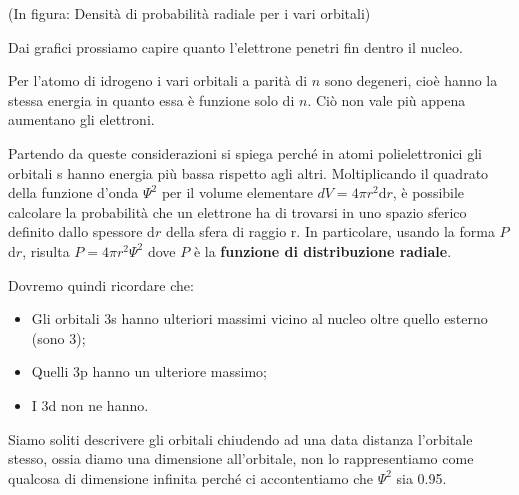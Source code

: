 (In figura: Densità di probabilità radiale per i vari orbitali)

\vspace{0.2cm}Dai grafici prossiamo capire quanto l'elettrone penetri fin dentro il nucleo.

\vspace{0.2cm}Per l'atomo di idrogeno i vari orbitali a parità di $n$ sono degeneri, cioè hanno la stessa energia in quanto essa è funzione solo di $n$. Ciò non vale più appena aumentano gli elettroni.

\vspace{0.2cm}Partendo da queste considerazioni si spiega perché in atomi polielettronici gli orbitali s hanno energia più bassa rispetto agli altri.
Moltiplicando il quadrato della funzione d'onda $\Psi^2$ per il volume elementare $dV=4\pi r^2\text{d}r$, è possibile calcolare la probabilità che un elettrone ha di trovarsi in uno spazio sferico definito dallo spessore d$r$ della sfera di raggio r. In particolare, usando la forma $P$d$r$, risulta $P=4\pi r^2\Psi^2$ dove $P$ è la \textbf{funzione di distribuzione radiale}.


\vspace{0.2cm}Dovremo quindi ricordare che:
\begin{itemize}
  \item Gli orbitali 3s hanno ulteriori massimi vicino al nucleo oltre quello esterno (sono 3);
  \item Quelli 3p hanno un ulteriore massimo;
  \item I 3d non ne hanno.
\end{itemize}
Siamo soliti descrivere gli orbitali chiudendo ad una data distanza l'orbitale stesso, ossia diamo una dimensione all'orbitale, non lo rappresentiamo come qualcosa di dimensione infinita perché ci accontentiamo che $\Psi^2$ sia 0.95.
